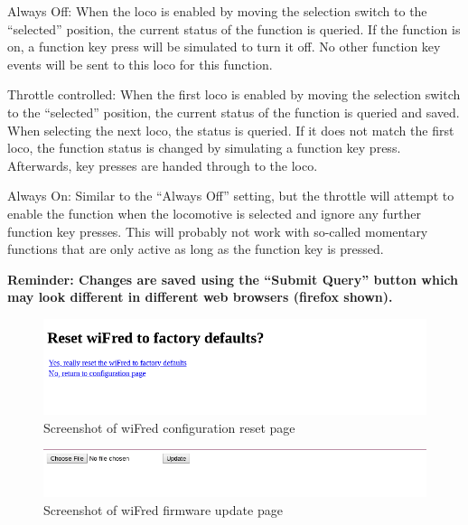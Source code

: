 \documentclass[11pt,a4paper]{scrartcl}
\begin{document}
\begin{description}
\item{Always Off:} When the loco is enabled by moving the selection switch to the ``selected'' position, the current status of the function is queried. If the function is on, a function key press will be simulated to turn it off. No other function key events will be sent to this loco for this function.
\item{Throttle controlled:} When the first loco is enabled by moving the selection switch to the ``selected'' position, the current status of the function is queried and saved. When selecting the next loco, the status is queried. If it does not match the first loco, the function status is changed by simulating a function key press. Afterwards, key presses are handed through to the loco.
\item{Always On:} Similar to the ``Always Off'' setting, but the throttle will attempt to enable the function when the locomotive is selected and ignore any further function key presses. This will probably not work with so-called momentary functions that are only active as long as the function key is pressed.
\end{description}

\textbf{Reminder: Changes are saved using the ``Submit Query'' button which may look different in different web browsers (firefox shown).}

\begin{figure}[tbh]
  \centering
  \includegraphics[width=0.8 \textwidth]{images/wiFred_reset_page}
  \caption{Screenshot of wiFred configuration reset page}
  \label{throttleConfResetPage}
\end{figure}

\begin{figure}[tbh]
  \centering
  \includegraphics[width=0.8 \textwidth]{images/wiFred_update_page}
  \caption{Screenshot of wiFred firmware update page}
  \label{throttleConfUpdatePage}
\end{figure}
\end{document}

